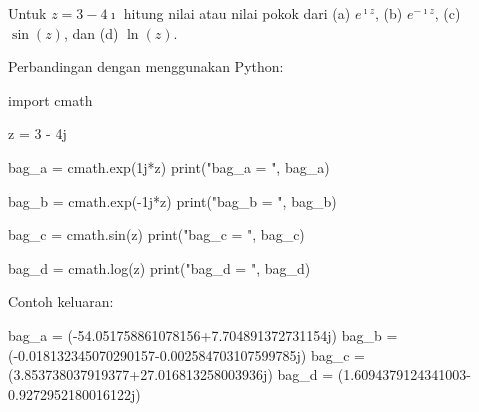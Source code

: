 \begin{contoh}
Untuk $z = 3 - 4\imath$ hitung nilai atau nilai pokok dari (a) $e^{\imath z}$,
(b) $e^{-\imath z}$, (c) $\sin(z)$, dan (d) $\ln(z)$. 
\end{contoh}

Perbandingan dengan menggunakan Python:
\begin{pythoncode}
import cmath

z = 3 - 4j
    
bag_a = cmath.exp(1j*z)
print("bag_a = ", bag_a)

bag_b = cmath.exp(-1j*z)
print("bag_b = ", bag_b)

bag_c = cmath.sin(z)
print("bag_c = ", bag_c)

bag_d = cmath.log(z)
print("bag_d = ", bag_d)    
\end{pythoncode}

Contoh keluaran:
\begin{textcode}
bag_a =  (-54.051758861078156+7.704891372731154j)
bag_b =  (-0.018132345070290157-0.002584703107599785j)
bag_c =  (3.853738037919377+27.016813258003936j)
bag_d =  (1.6094379124341003-0.9272952180016122j)
\end{textcode}



